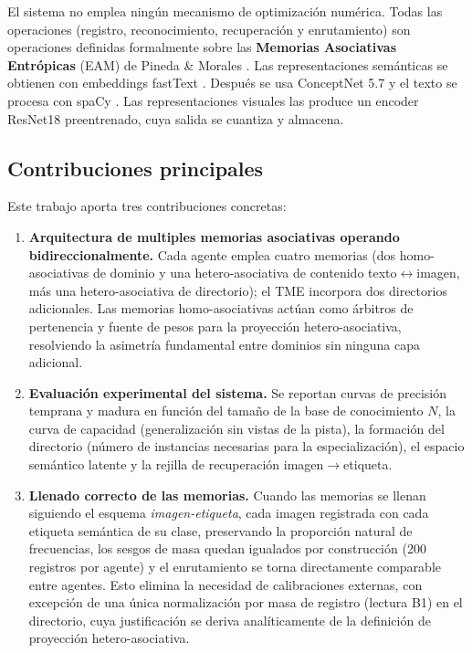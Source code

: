 El sistema no emplea ningún mecanismo de optimización numérica.
Todas las operaciones (registro, reconocimiento, recuperación y enrutamiento) son
operaciones definidas formalmente sobre las \textbf{Memorias Asociativas Entrópicas}
(EAM) de Pineda \& Morales \cite{pineda2021entropic,pineda2024hetero}.
Las representaciones semánticas se obtienen con embeddings fastText
\cite{bojanowski2017fasttext}.
Después se usa ConceptNet 5.7 \cite{speer2017conceptnet}
y el texto se procesa con spaCy \cite{honnibal2020spacy}.
Las representaciones visuales las produce un encoder ResNet18 \cite{he2016resnet}
preentrenado, cuya salida se cuantiza y almacena.

\subsection*{Contribuciones principales}

Este trabajo aporta tres contribuciones concretas:

\begin{enumerate}
    \item \textbf{Arquitectura de multiples memorias asociativas operando bidireccionalmente.}
    Cada agente emplea cuatro memorias (dos homo-asociativas de dominio y una
    hetero-asociativa de contenido texto$\leftrightarrow$imagen, más una hetero-asociativa
    de directorio); el TME incorpora dos directorios adicionales.
    Las memorias homo-asociativas actúan como árbitros de pertenencia y fuente de pesos
    para la proyección hetero-asociativa, resolviendo la asimetría fundamental entre
    dominios sin ninguna capa adicional.

    \item \textbf{Evaluación experimental del sistema.}
    Se reportan curvas de precisión temprana y madura en función del tamaño de la base
    de conocimiento $N$, la curva de capacidad (generalización sin vistas de la pista), la
    formación del directorio (número de instancias necesarias para la especialización),
    el espacio semántico latente y la rejilla de recuperación imagen$\to$etiqueta.

    \item \textbf{Llenado correcto de las memorias.}
    Cuando las memorias se llenan siguiendo el esquema \emph{imagen-etiqueta}, cada imagen
    registrada con cada etiqueta semántica de su clase, preservando la proporción natural
    de frecuencias, los sesgos de masa quedan igualados por construcción (200 registros
    por agente) y el enrutamiento se torna directamente comparable entre agentes.
    Esto elimina la necesidad de calibraciones externas, con excepción de una única
    normalización por masa de registro (lectura B1) en el directorio, cuya justificación
    se deriva analíticamente de la definición de proyección hetero-asociativa.
\end{enumerate}

